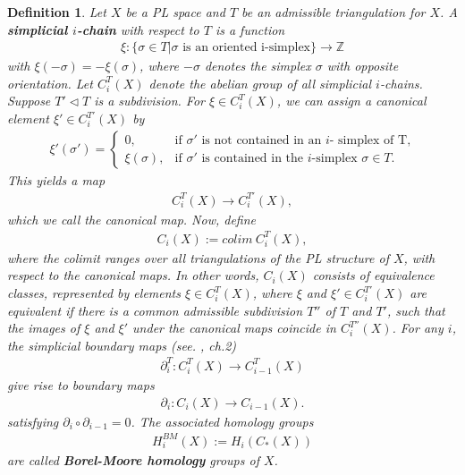 \documentclass[11pt]{book}
\newtheorem{definition}{Definition}
\begin{document}
\begin{definition}
Let $X$ be a PL space and $T$ be an admissible triangulation for $X$. A \textbf{simplicial $i$-chain} with respect to $T$ is a function
\begin{align*}
\xi : \{ \sigma \in T | \sigma \text{ is an oriented i-simplex} \}  \to \mathbb{Z}
\end{align*}
with $\xi (-\sigma)=- \xi(\sigma)$, where $-\sigma$ denotes the simplex $\sigma$ with opposite orientation. Let $C_i^{T}(X)$ denote the abelian group of all simplicial $i$-chains. Suppose $T' \lhd T$ is a subdivision. For $\xi \in C_i^T(X)$, we can assign a canonical element $\xi' \in C_i^{T'}(X)$ by 
\begin{align*}
\xi'(\sigma')= \begin{cases} 0, &\text{if $\sigma'$ is not contained in an $i$- simplex of T,} \\ \xi(\sigma), &\text{if $\sigma'$ is contained in the $i$-simplex $\sigma \in T.$} \end{cases}
\end{align*}
This yields a map
\begin{align*}
C_i^T(X) \to C_i^{T'}(X),
\end{align*}
which we call the canonical map. Now, define
\begin{align*}
C_i(X) := colim \ C_i^T(X),
\end{align*}
where the colimit ranges over all triangulations of the PL structure of $X$, with respect to the canonical maps. In other words, $C_i(X)$ consists of equivalence classes, represented by elements $\xi \in C_i^T(X)$, where $\xi$ and $\xi' \in C_i^{T'}(X)$ are equivalent if there is a common admissible subdivision $T''$ of $T$ and $T'$, such that the images of $\xi$ and $\xi'$ under the canonical maps coincide in $C_i^{T''}(X)$. For any $i$, the simplicial boundary maps (see. \cite{hatcher}, ch.2)
\begin{align*}
\partial_i^T: C_i^T(X) \to C_{i-1}^T(X)
\end{align*}
give rise to boundary maps 
\begin{align*}
\partial_i : C_i(X) \to C_{i-1}(X).
\end{align*}
satisfying $\partial_i \circ \partial_{i-1}=0$. The associated homology groups
\begin{align*}
H_i^{BM}(X):= H_i(C_*(X))
\end{align*}
are called \textbf{Borel-Moore homology} groups of $X$.
\end{definition}
\end{document}
